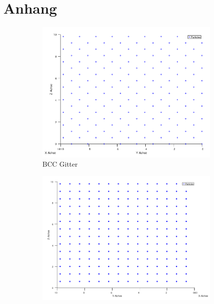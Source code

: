 \documentclass[12pt,a4paper,ngerman]{article}
\begin{document}
\section*{Anhang}\label{ch:Anhang}%
	\begin{figure}[ht]
	\centering
	\begin{subfigure}[b]{0.3\textwidth}
		\includegraphics[width=\textwidth]{data/BCC_perfect.png}
		\caption{BCC Gitter}
	\end{subfigure}
	\hfill %
	\begin{subfigure}[b]{0.3\textwidth}
		\includegraphics[width=\textwidth]{data/FCC_perfect.png}

\end{subfigure}
\end{figure}
\end{document}
